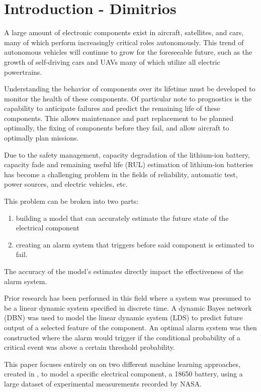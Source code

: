 
\section{Introduction - Dimitrios}

A large amount of electronic components exist in aircraft, satellites, and cars, many of which perform increasingly critical roles autonomously.  This trend of autonomous vehicles will continue to grow for the foreseeable future, such as the growth of self-driving cars and UAVs many of which utilize all electric powertrains.

Understanding the behavior of components over its lifetime must be developed to monitor the health of these components.  Of particular note to prognostics is the capability to anticipate failures and predict the remaining life of these components.  This allows maintenance and part replacement to be planned optimally, the fixing of components before they fail, and allow aircraft to optimally plan missions.

Due to the safety management, capacity degradation of the lithium-ion battery, capacity fade and remaining useful life (RUL) estimation of lithium-ion batteries has become a challenging problem in the fields of reliability, automatic test, power sources, and electric vehicles, etc. 

This problem can be broken into two parts: 
\begin{enumerate}
\item building a model that can accurately estimate the future state of the electrical component
\item creating an alarm system that triggers before said component is estimated to fail.  
\end{enumerate}
The accuracy of the model’s estimates directly impact the effectiveness of the alarm system.

Prior research has been performed in this field where a system was presumed to be a linear dynamic system specified in discrete time.  A dynamic Bayes network (DBN) was used to model the linear dynamic system (LDS) to predict future output of a selected feature of the component.  An optimal alarm system was then constructed where the alarm would trigger if the conditional probability of a critical event was above a certain threshold probability.

This paper focuses entirely on on two different machine learning approaches, created in \MATLAB, to model a specific electrical component, a 18650 \lib battery, using a large dataset of experimental measurements recorded by NASA.



